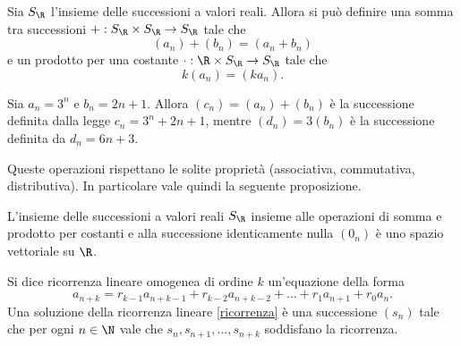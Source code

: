 \begin{definition}
    Sia $S_{\R}$ l'insieme delle successioni a valori reali. Allora si può definire una somma tra successioni $+ : S_{\R} \times S_{\R} \to S_{\R}$ tale che \[
        (a_n) + (b_n) = (a_n + b_n)  
    \] e un prodotto per una costante $\cdot : \R \times S_{\R} \to S_{\R}$ tale che \[
        k(a_n) = (ka_n).    
    \]
\end{definition}

\begin{example}
    Sia $a_n = 3^n$ e $b_n = 2n + 1$. Allora $(c_n) = (a_n) + (b_n)$ è la successione definita dalla legge $c_n = 3^n + 2n + 1$, mentre $(d_n) = 3(b_n)$ è la successione definita da $d_n = 6n + 3$.
\end{example}

Queste operazioni rispettano le solite proprietà (associativa, commutativa, distributiva). In particolare vale quindi la seguente proposizione.

\begin{proposition}
    L'insieme delle successioni a valori reali $S_{\R}$ insieme alle operazioni di somma e prodotto per costanti e alla successione identicamente nulla $(0_n)$ è uno spazio vettoriale su $\R$.
\end{proposition}

\begin{definition}
    Si dice ricorrenza lineare omogenea di ordine $k$ un'equazione della forma \begin{equation} \label{ricorrenza}
        a_{n+k} = r_{k-1}a_{n+k-1} + r_{k-2}a_{n+k-2} + \dots + r_{1}a_{n+1} + r_0a_n. 
    \end{equation}
    Una soluzione della ricorrenza lineare \ref{ricorrenza} è una successione $(s_n)$ tale che per ogni $n \in \N$ vale che $s_n, s_{n+1}, \dots, s_{n+k}$ soddisfano la ricorrenza.
\end{definition}

